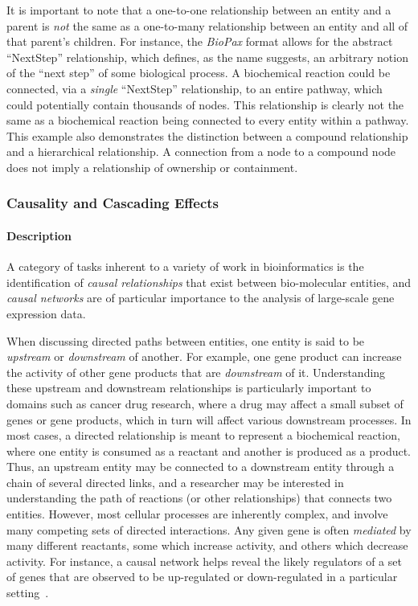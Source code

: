 It is important to note that a one-to-one relationship between an entity and a parent is \textit{not} the same as a one-to-many relationship between an entity and all of that parent's children.
For instance, the \textit{BioPax} format allows for the abstract ``NextStep'' relationship, which defines, as the name suggests, an arbitrary notion of the ``next step'' of some biological process.
A biochemical reaction could be connected, via a \textit{single} ``NextStep'' relationship, to an entire pathway, which could potentially contain thousands of nodes.
This relationship is clearly not the same as a biochemical reaction being connected to every entity within a pathway.
This example also demonstrates the distinction between a compound relationship and a hierarchical relationship.
A connection from a node to a compound node does not imply a relationship of ownership or containment.

\subsubsection*{Causality and Cascading Effects}

\paragraph*{Description}

A category of tasks inherent to a variety of work in bioinformatics is the identification of \textit{causal relationships} that exist between bio-molecular entities, and \emph{causal networks} are of particular importance to the analysis of large-scale gene expression data.

When discussing directed paths between entities, one entity is said to be \emph{upstream} or \emph{downstream} of another.
For example, one gene product can increase the activity of other gene products that are \emph{downstream} of it.
Understanding these upstream and downstream relationships is particularly important to domains such as cancer drug research, where a drug may affect a small subset of genes or gene products, which in turn will affect various downstream processes.
In most cases, a directed relationship is meant to represent a biochemical reaction, where one entity is consumed as a reactant and another is produced as a product.
Thus, an upstream entity may be connected to a downstream entity through a chain of several directed links, and a researcher may be interested in understanding the path of reactions (or other relationships) that connects two entities.
However, most cellular processes are inherently complex, and involve many competing sets of directed interactions.
Any given gene is often \textit{mediated} by many different reactants, some which increase activity, and others which decrease activity.
For instance, a causal network helps reveal the likely regulators of a set of genes that are observed to be up-regulated or down-regulated in a particular setting~\cite{felciano2013predictive, Kramer2013ipa-causal}.

